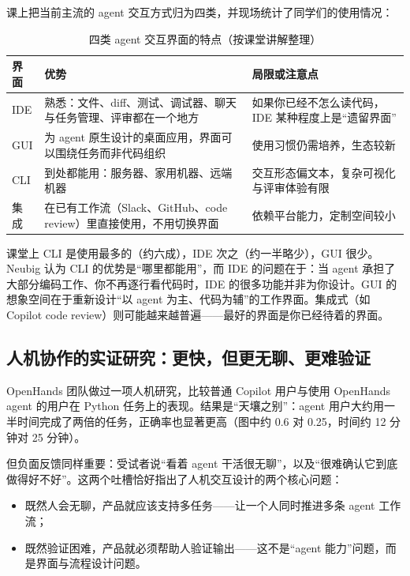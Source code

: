 \documentclass[a4paper]{article}
\begin{document}
课上把当前主流的 agent 交互方式归为四类，并现场统计了同学们的使用情况：

\begin{table}[H]
\centering
\small
\caption{四类 agent 交互界面的特点（按课堂讲解整理）}
\begin{tabular}{p{}p{}p{}}
\toprule
界面 & 优势 & 局限或注意点 \\
\midrule
IDE & 熟悉：文件、diff、测试、调试器、聊天与任务管理、评审都在一个地方 & 如果你已经不怎么读代码，IDE 某种程度上是“遗留界面” \\
GUI & 为 agent 原生设计的桌面应用，界面可以围绕任务而非代码组织 & 使用习惯仍需培养，生态较新 \\
CLI & 到处都能用：服务器、家用机器、远端机器 & 交互形态偏文本，复杂可视化与评审体验有限 \\
集成 & 在已有工作流（Slack、GitHub、code review）里直接使用，不用切换界面 & 依赖平台能力，定制空间较小 \\
\bottomrule
\end{tabular}
\end{table}

课堂上 CLI 是使用最多的（约六成），IDE 次之（约一半略少），GUI 很少。Neubig 认为 CLI 的优势是“哪里都能用”，而 IDE 的问题在于：当 agent 承担了大部分编码工作、你不再逐行看代码时，IDE 的很多功能并非为你设计。GUI 的想象空间在于重新设计“以 agent 为主、代码为辅”的工作界面。集成式（如 Copilot code review）则可能越来越普遍——最好的界面是你已经待着的界面。

\subsection{人机协作的实证研究：更快，但更无聊、更难验证}

OpenHands 团队做过一项人机研究，比较普通 Copilot 用户与使用 OpenHands agent 的用户在 Python 任务上的表现。结果是“天壤之别”：agent 用户大约用一半时间完成了两倍的任务，正确率也显著更高（图中约 0.6 对 0.25，时间约 12 分钟对 25 分钟）。

但负面反馈同样重要：受试者说“看着 agent 干活很无聊”，以及“很难确认它到底做得好不好”。这两个吐槽恰好指出了人机交互设计的两个核心问题：

\begin{itemize}
\item 既然人会无聊，产品就应该支持多任务——让一个人同时推进多条 agent 工作流；
\item 既然验证困难，产品就必须帮助人验证输出——这不是“agent 能力”问题，而是界面与流程设计问题。
\end{itemize}
\end{document}
